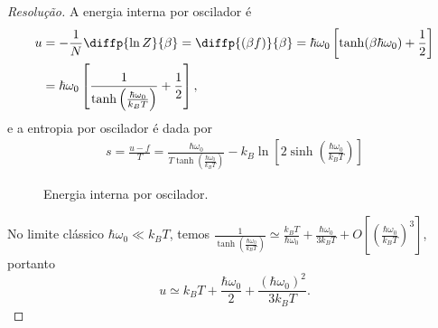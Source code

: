 \begin{proof}[Resolução]
    A energia interna por oscilador é
    \begin{align*}
        u &= -\frac1N \diffp{\ln Z}{\beta} = \diffp{(\beta f)}{\beta}= \hbar\omega_0\left[\tanh(\beta \hbar \omega_0)+\frac12 \right]\\
          &= \hbar \omega_0 \left[\frac{1}{\tanh\left(\frac{\hbar \omega_0}{k_B T}\right)} + \frac12\right],
    \end{align*}
    e a entropia por oscilador é dada por
    \begin{align*}
        s = \frac{u - f}{T} = \frac{\hbar \omega_0}{T\tanh\left(\frac{\hbar\omega_0}{k_BT}\right)} - k_B \ln\left[2\sinh\left(\frac{\hbar \omega_0}{k_B T}\right)\right]
    \end{align*}
    \begin{figure}[!ht]
        \centering
        \caption{Energia interna por oscilador.}
    \end{figure}

    No limite clássico \(\hbar \omega_0 \ll k_B T\), temos \(\frac{1}{\tanh\left(\frac{\hbar \omega_0}{k_B T}\right)} \simeq \frac{k_B T}{\hbar \omega_0} + \frac{\hbar \omega_0}{3 k_B T} + O\left[\left(\frac{\hbar \omega_0}{k_B T}\right)^3\right]\), portanto
    \begin{equation*}
        u \simeq k_B T + \frac{\hbar \omega_0}{2} + \frac{(\hbar \omega_0)^2}{3 k_B T}.
    \end{equation*}
\end{proof}
